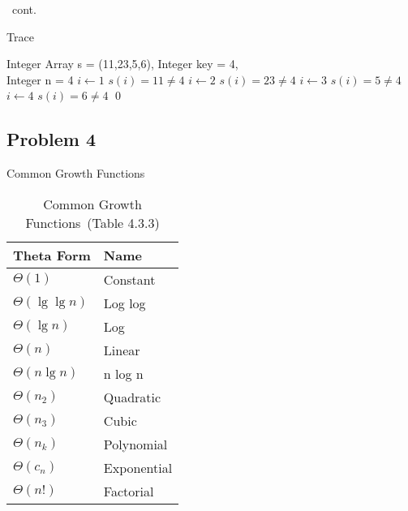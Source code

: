 \documentclass[
               handout,
               ]{beamer}
\begin{document}
        \begin{frame}[c,shrink]{\subsecname\ cont.}          
            \begin{algorithm}[H]
                \caption {Trace}
                \label{alg3}
                \begin{algorithmic}[1]
                    \REQUIRE Integer Array s = (11,23,5,6), Integer key = 4,\\ Integer n = 4
                    \STATE $i \leftarrow 1$
                    \STATE $s(i) = 11 \neq 4$
                    \STATE $i \leftarrow 2$
                    \STATE $s(i) = 23 \neq 4$
                    \STATE $i \leftarrow 3$
                    \STATE $s(i) = 5 \neq 4$
                    \STATE $i \leftarrow 4$
                    \STATE $s(i) = 6 \neq 4$
                     \qed
                \end{algorithmic}                
            \end{algorithm}        
        \end{frame}




    \subsection{Problem 4}
    
        \begin{frame}[c,shrink]{Common Growth Functions}
            \begin{table}[tp]%
                \caption{Common Growth Functions\ (Table 4.3.3)}
                \label{cgf}\centering%
                \begin{tabular}{ll}
                    \hline%
                    Theta Form             & Name         \\\hline%
                    $\Theta(1)         $   & Constant     \\
                    $\Theta(\lg\lg{n}) $   & Log log      \\
                    $\Theta(\lg{n})    $   & Log          \\
                    $\Theta(n)         $   & Linear       \\
                    $\Theta(n\lg{n})   $   & n log n      \\
                    $\Theta(n_2)       $   & Quadratic    \\
                    $\Theta(n_3)       $   & Cubic        \\
                    $\Theta(n_k)       $   & Polynomial   \\
                    $\Theta(c_n)       $   & Exponential  \\
                    $\Theta(n!)        $   & Factorial    \\\hline%
                \end{tabular}
            \end{table}
        \end{frame}
    
\end{document}
